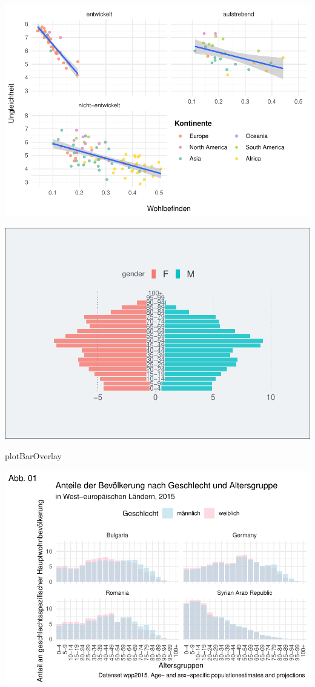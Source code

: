 \documentclass[
]{article}
\newenvironment{Shaded}{\begin{snugshade}}{\end{snugshade}}
\newcommand{\NormalTok}[1]{#1}
\begin{document}
\includegraphics{ggplot2_files/figure-latex/unnamed-chunk-9-1.pdf}

\includegraphics{ggplot2_files/figure-latex/unnamed-chunk-10-1.pdf}

\begin{Shaded}
\begin{Highlighting}[]
\NormalTok{plotBarOverlay}
\end{Highlighting}
\end{Shaded}

\includegraphics{ggplot2_files/figure-latex/unnamed-chunk-11-1.pdf}
\end{document}
